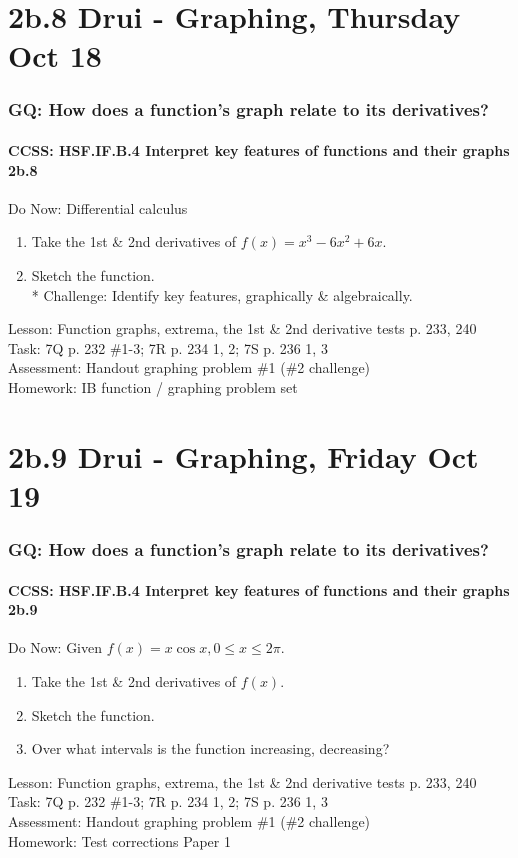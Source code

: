 \documentclass{beamer}
\begin{document}
\section{2b.8 Drui - Graphing, Thursday Oct 18}
  \frame
  {
    \frametitle{GQ: How does a function's graph relate to its derivatives?}
    \framesubtitle{CCSS: HSF.IF.B.4 Interpret key features of functions and their graphs \qquad \alert{2b.8}}

    \begin{block}{Do Now: Differential calculus}
    \begin{enumerate}
        \item Take the 1st \& 2nd derivatives of $f(x)=x^3-6x^2+6x$.
        \item Sketch the function.\\*
        Challenge: Identify key features, graphically \& algebraically.
    \end{enumerate}
    \end{block}
    Lesson: Function graphs, extrema, the 1st \& 2nd derivative tests p. 233, 240\\%
    Task: 7Q p. 232 \#1-3; 7R p. 234 1, 2; 7S p. 236 1, 3 \\%
    Assessment: Handout graphing problem \#1 (\#2 challenge)
    \\%
    Homework: IB function / graphing problem set
  }

  \section{2b.9 Drui - Graphing, Friday Oct 19}
  \frame
  {
    \frametitle{GQ: How does a function's graph relate to its derivatives?}
    \framesubtitle{CCSS: HSF.IF.B.4 Interpret key features of functions and their graphs \qquad \alert{2b.9}}

    \begin{block}{Do Now: Given $f(x)=x \cos x, 0 \leq x \leq 2\pi$.}
    \begin{enumerate}
        \item Take the 1st \& 2nd derivatives of $f(x)$. \item Sketch the function. \item Over what intervals is the function increasing, decreasing?
    \end{enumerate}
    \end{block}
    Lesson: Function graphs, extrema, the 1st \& 2nd derivative tests p. 233, 240\\%
    Task: 7Q p. 232 \#1-3; 7R p. 234 1, 2; 7S p. 236 1, 3 \\%
    Assessment: Handout graphing problem \#1 (\#2 challenge)
    \\%
    Homework: Test corrections Paper 1
  }
\end{document}

